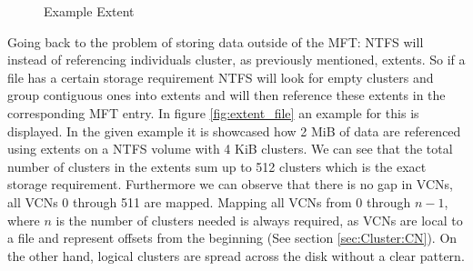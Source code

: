 \begin{figure}[h]
	\centering
	\caption{Example Extent\label{fig:extent_basic}}
\end{figure}
Going back to the problem of storing data outside of the MFT: NTFS will instead of referencing individuals cluster, as previously mentioned, extents. So if a file has a certain storage requirement NTFS will look for empty clusters and group contiguous ones into extents and will then reference these extents in the corresponding MFT entry. In figure \ref{fig:extent_file} an example for this is displayed. In the given example it is showcased how 2 MiB of data are referenced using extents on a NTFS volume with 4 KiB clusters.
We can see that the total number of clusters in the extents sum up to 512 clusters which is the exact storage requirement. Furthermore we can observe that there is no gap in VCNs, all VCNs 0 through 511 are mapped. Mapping all VCNs from 0 through $n-1$, where $n$ is the number of clusters needed is always required, as VCNs are local to a file and represent offsets from the beginning (See section \ref{sec:Cluster:CN}). On the other hand, logical clusters are spread across the disk without a clear pattern.\cite{RUSSINOVICH_ET_AL:2012:WI}
